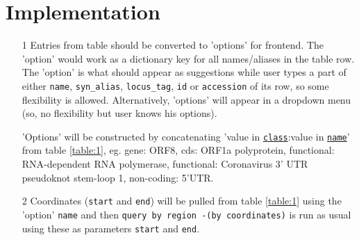 \documentclass[a4paper, 10pt]{article}        %
\begin{document}
\section{Implementation} 
\begin{itemize}
\item[1] Entries from table should be converted to 'options' for frontend. The 'option' would work as a dictionary key for all names/aliases in the table row. The 'option' is what should appear as suggestions while user types a part of either \texttt{name}, \texttt{syn\_alias},  \texttt{locus\_tag}, \texttt{id} or \texttt{accession} of its row, so some flexibility is allowed. Alternatively, 'options' will appear in a dropdown menu (so, no flexibility but user knows his options).

'Options' will be constructed by concatenating 'value in \underline{\texttt{class}}:value in \underline{\texttt{name}}' from table \ref{table:1}, eg. gene: ORF8, cds: ORF1a polyprotein, functional: RNA-dependent RNA polymerase, functional: Coronavirus 3' UTR pseudoknot stem-loop 1, non-coding: 5'UTR.






\item[2] Coordinates (\texttt{start} and \texttt{end}) will be pulled from table \ref{table:1} using the 'option' \texttt{name} and then \texttt{query by region -(by coordinates)} is run as usual using these as parameters \texttt{start} and \texttt{end}.

\end{itemize}





\end{document}
